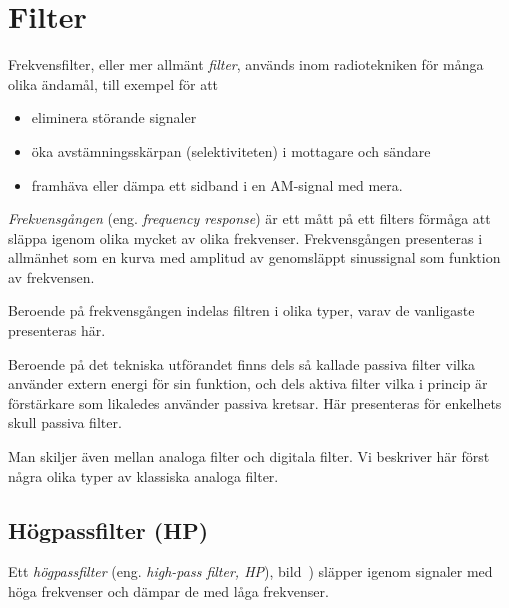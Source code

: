 \section{Filter}
\label{filter}

Frekvensfilter, eller mer allmänt \emph{filter}, används inom radiotekniken för
många olika ändamål, till exempel för att
\begin{itemize}
  \item eliminera störande signaler
  \item öka avstämningsskärpan (selektiviteten) i mottagare och sändare
  \item framhäva eller dämpa ett sidband i en AM-signal med mera.
\end{itemize}

\emph{Frekvensgången} (eng. \emph{frequency response}) är ett mått på ett
filters förmåga att släppa igenom olika mycket av olika frekvenser.
Frekvensgången presenteras i allmänhet som en kurva med amplitud av genomsläppt
sinussignal som funktion av frekvensen.

Beroende på frekvensgången indelas filtren i olika typer, varav de vanligaste
presenteras här.

Beroende på det tekniska utförandet finns dels så kallade passiva filter vilka
använder extern energi för sin funktion, och dels aktiva filter vilka i princip
är förstärkare som likaledes använder passiva kretsar.
Här presenteras för enkelhets skull passiva filter.

Man skiljer även mellan analoga filter och digitala filter.
Vi beskriver här först några olika typer av klassiska analoga filter.

\subsection{Högpassfilter (HP)}


Ett \emph{högpassfilter} (eng. \emph{high-pass filter, HP}),
bild~) släpper igenom signaler med höga frekvenser och
dämpar de med låga frekvenser.

